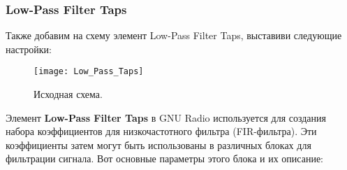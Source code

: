 \documentclass[a4paper,12pt]{extarticle}
\begin{document}
\newpage
\subsubsection{Low-Pass Filter Taps}

\hspace{1.15cm}Также добавим на схему элемент Low-Pass Filter Taps, выставиви следующие настройки:\\
\begin{figure}[H]
    \centering
    \texttt{[image: Low\_Pass\_Taps]}
    \caption{Исходная схема.} %
    \label{fig:Low_Pass_Taps} %
\end{figure}

Элемент \textbf{Low-Pass Filter Taps} в GNU Radio используется для создания набора коэффициентов 
для низкочастотного фильтра (FIR-фильтра). Эти коэффициенты затем могут быть использованы в 
различных блоках для фильтрации сигнала. Вот основные параметры этого блока и их описание:
\end{document}
